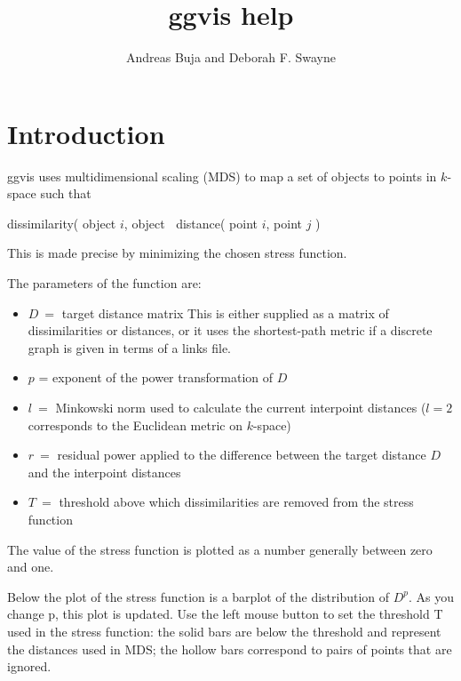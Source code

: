 \documentclass[11pt]{article}
\begin{document}
\title{ggvis help}
\author{Andreas Buja and Deborah F. Swayne}
\maketitle


\section{Introduction}

ggvis uses multidimensional scaling (MDS) to map a set of objects
to points in $k$-space such that

  dissimilarity( object $i$, object $~$ distance( point $i$, point $j$ )

This is made precise by minimizing the chosen stress function.

The parameters of the function are:
\begin{itemize}
\item   

$D ~ =$ target distance matrix 
    This is either supplied as a matrix of dissimilarities or
    distances, or it uses the shortest-path metric if a discrete
    graph is given in terms of a links file.
\item
$p$ = exponent of the power transformation of $D$
\item
$l ~ =$ Minkowski norm used to calculate the current interpoint 
    distances ($l=2$ corresponds to the Euclidean metric on $k$-space)
\item
$r ~ =$ residual power applied to the difference between the target
    distance $D$ and the interpoint distances
\item
$T ~ =$ threshold above which dissimilarities are removed from the 
    stress function
\end{itemize}

The value of the stress function is plotted as a number generally between
zero and one.

Below the plot of the stress function is a barplot of the distribution
of $D^p$.  As you change p, this plot is updated.  Use the left mouse
button to set the threshold T used in the stress function: the solid
bars are below the threshold and represent the distances used in MDS;
the hollow bars correspond to pairs of points that are ignored.
\end{document}
